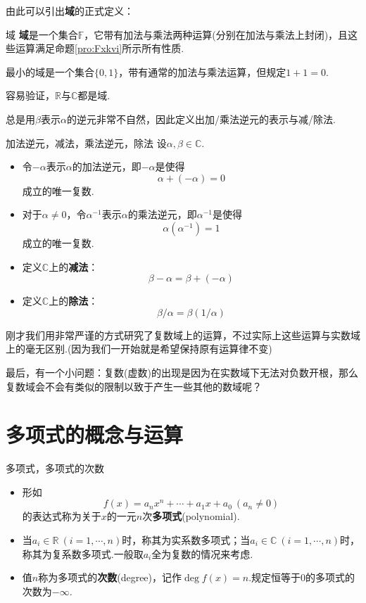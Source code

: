 \documentclass[lang=cn, zihao=5]{elegantbook}
\newcommand{\R}{\mathbb{R}}
\newcommand{\C}{\mathbb{C}}
\newcommand{\F}{\mathbb{F}}
\begin{document}
由此可以引出\textbf{域}的正式定义：

\begin{definition}{域}
	\textbf{域}是一个集合$\F$，它带有加法与乘法两种运算(分别在加法与乘法上封闭)，且这些运算满足命题\ref{pro:Fxkvi}所示所有性质.
\end{definition}
\begin{remark}
	最小的域是一个集合$\{ 0,1 \}$，带有通常的加法与乘法运算，但规定$1+1=0$.
\end{remark}

容易验证，$\R$与$\C$都是域.

总是用$\beta$表示$\alpha$的逆元非常不自然，因此定义出加/乘法逆元的表示与减/除法.

\begin{definition}{加法逆元，减法，乘法逆元，除法}
	设$\alpha , \beta \in \C $.
	\begin{itemize}
		\item 令$- \alpha$表示$\alpha$的加法逆元，即$-\alpha$是使得$$\alpha + (-\alpha) = 0$$成立的唯一复数.
		\item 对于$\alpha \neq 0$，令$\alpha ^{-1}$表示$\alpha$的乘法逆元，即$\alpha ^{-1}$是使得$$\alpha (\alpha ^{-1}) = 1$$成立的唯一复数.
		\item 定义$\C $上的\textbf{减法}：$$\beta - \alpha = \beta + (-\alpha)$$
		\item 定义$\C $上的\textbf{除法}：$$\beta / \alpha = \beta (1 / \alpha)$$
	\end{itemize}
\end{definition}

刚才我们用非常严谨的方式研究了复数域上的运算，不过实际上这些运算与实数域上的毫无区别.(因为我们一开始就是希望保持原有运算律不变)

最后，有一个小问题：复数(虚数)的出现是因为在实数域下无法对负数开根，那么复数域会不会有类似的限制以致于产生一些其他的数域呢？

\section{多项式的概念与运算}

\begin{definition}{多项式，多项式的次数}
	\begin{itemize}
		\item 形如$$f(x) = a_nx^n + \cdots + a_1x + a_0~(a_n \neq 0)$$的表达式称为关于$x$的一元$n$次\textbf{多项式}(polynomial).
		\item 当$a_i \in \mathbb{R}~(i=1, \cdots ,n)$时，称其为实系数多项式；当$a_i \in \mathbb{C}~(i=1, \cdots ,n)$时，称其为复系数多项式.一般取$a_i$全为复数的情况来考虑.
		\item 值$n$称为多项式的\textbf{次数}(degree)，记作$\deg f(x) = n$.规定恒等于$0$的多项式的次数为$-\infty$.
	\end{itemize}
\end{definition}
\end{document}
